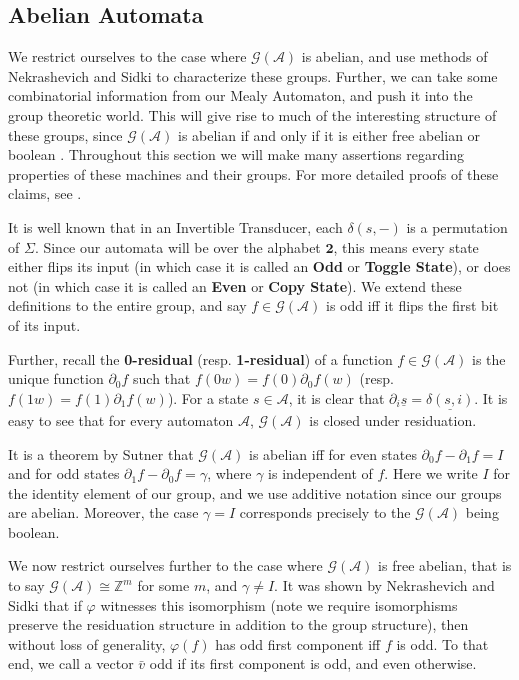 \documentclass[12pt]{article}
\newcommand{\A}{\mathcal{A}}
\newcommand{\G}{\mathcal{G}}
\newcommand{\Z}{\mathbb{Z}}
\newcommand{\2}{\textbf{2}}
\newcommand{\del}{\partial}
\renewcommand{\v}{\bar{v}}
\begin{document}
\subsection{Abelian Automata}
We restrict ourselves to the case where $\G(\A)$ is abelian, 
and use methods of Nekrashevich and Sidki to characterize these groups.
Further, we can take some combinatorial information from our Mealy 
Automaton, and push it into the group theoretic world. This will give
rise to much of the interesting structure of these groups, since
$\G(\A)$ is abelian if and only if it is either free abelian or 
boolean \cite{NekrashevychSidki04:automorphisms}.
Throughout this section we will make many assertions regarding properties
of these machines and their groups. For more detailed proofs of these 
claims, see 
\cite{Nekrashevych05:self_similar_groups%
     ,GrigorchukNS00:automata_groups%
     ,Sidki00:one_rooted_trees%
     ,SutnerLewi12:iter_inver_bin_trans%
     ,Okano15:thesis%
     ,Sutner18:abelian_automata%
     }.

It is well known that in an Invertible Transducer, each $\delta(s,-)$
is a permutation of $\Sigma$. Since our automata will be over the alphabet
$\2$, this means every state either flips its input 
(in which case it is called an \textbf{Odd} or \textbf{Toggle State}), 
or does not
(in which case it is called an \textbf{Even} or \textbf{Copy State}).
We extend these definitions to the entire group, and say $f \in \G(\A)$ 
is odd iff it flips the first bit of its input.

Further, recall the \textbf{0-residual} (resp. \textbf{1-residual}) of a 
function $f \in \G(\A)$ is the unique function 
$\del_0 f$ such that $f(0w) = f(0) \del_0 f(w)$ 
(resp. $f(1w) = f(1) \del_1 f(w)$). 
For a state $s \in \A$, it is clear that 
$\del_i \underline{s} = \underline{\delta(s,i)}$.
It is easy to see that for every automaton $\A$, $\G(\A)$ is closed
under residuation.

It is a theorem by Sutner \cite{Sutner18:abelian_automata} 
that $\G(\A)$ is abelian iff for even states $\del_0 f - \del_1 f = I$ 
and for odd states $\del_1 f - \del_0 f = \gamma$, where $\gamma$ is 
independent of $f$. Here we write $I$ for the identity element of our group,
and we use additive notation since our groups are abelian.
Moreover, the case $\gamma = I$ corresponds precisely to the $\G(\A)$
being boolean.

We now restrict ourselves further to the case where $\G(\A)$ is 
free abelian, that is to say $\G(\A) \cong \Z^m$ for some $m$,
and $\gamma \not = I$.
It was shown by Nekrashevich and Sidki 
\cite{NekrashevychSidki04:automorphisms} that if $\varphi$ witnesses this 
isomorphism (note we require isomorphisms preserve the residuation structure
in addition to the group structure), then without loss of generality, 
$\varphi(f)$ has odd first component iff $f$ is odd. 
To that end, we call a vector $\v$ odd if its first component is odd, 
and even otherwise.
\end{document}
